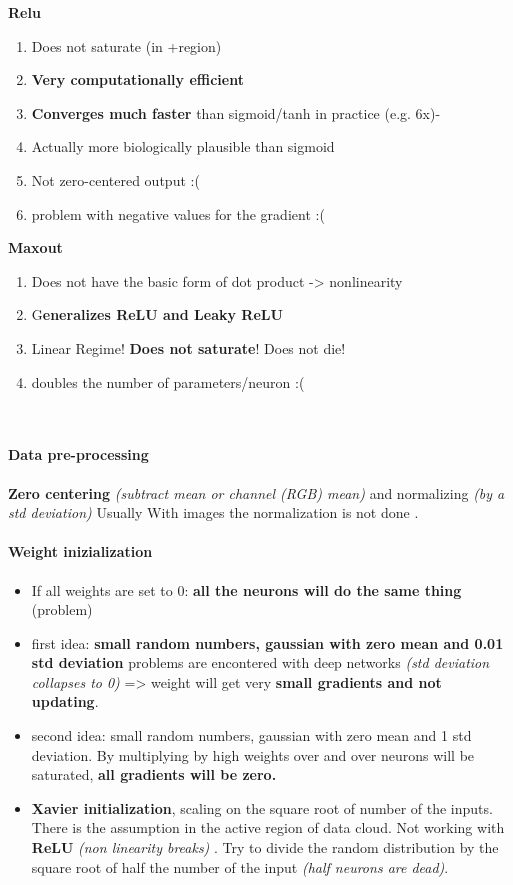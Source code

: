 \documentclass[11pt]{article}
\begin{document}
\begin{minipage}{0.5\textwidth}



\textbf{Relu}
\begin{enumerate}
    \item Does not saturate (in +region)
    \item \textbf{Very computationally efficient}
    \item \textbf{Converges much faster }than sigmoid/tanh in practice (e.g. 6x)-
    \item Actually more biologically plausible than sigmoid
    \item Not zero-centered output :(
    \item problem with negative values for the gradient :(
\end{enumerate}{}





\textbf{Maxout}
\begin{enumerate}
    \item Does not have the basic form of dot product -> nonlinearity
    \item G\textbf{eneralizes ReLU and Leaky ReLU }
    \item Linear Regime! \textbf{Does not saturate}! Does not die!
    \item doubles the number of parameters/neuron :(
\end{enumerate}{}
\end{minipage}\\
\paragraph{Data pre-processing}
\textbf{Zero centering} \textit{(subtract mean or channel (RGB) mean)} and normalizing \textit{(by a std deviation)}
Usually With images the normalization is not done .
\clearpage
\paragraph{Weight inizialization}
\begin{itemize}
    \item If all weights are set to 0: \textbf{all the neurons will do the same thing }(problem)
    \item first idea: \textbf{small random numbers, gaussian with zero mean and 0.01 std deviation}
  problems are encontered  with deep networks \textit{(std deviation collapses to 0)} => weight will get very \textbf{small gradients and not updating}.
  \item second idea: small random numbers, gaussian with zero mean and 1 std deviation. 
  By multiplying by high weights over and over neurons will be saturated, \textbf{ all gradients will be zero.}
\item \textbf{Xavier initialization},  scaling on the square root of number of the inputs. There is the assumption in the active region of data cloud.
Not working with \textbf{ReLU} \textit{(non linearity breaks)} . Try to divide the random distribution by the square root of half the number of the input \textit{(half neurons are dead)}.


\end{itemize}{}
\end{document}
